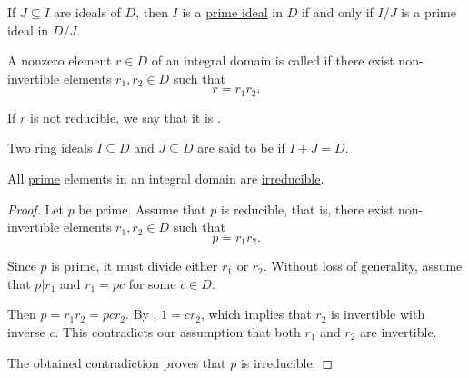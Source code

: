 \begin{proposition}\label{thm:prime_ideal_iff_prime_quotient_ideal}
  If \( J \subseteq I \) are ideals of \( D \), then \( I \) is a \hyperref[def:prime_ring_ideal]{prime ideal} in \( D \) if and only if \( I / J \) is a prime ideal in  \( D / J \).
\end{proposition}

\begin{definition}\label{def:irreducible_ring_element}
  A nonzero element \( r \in D \) of an integral domain is called  if there exist non-invertible elements \( r_1, r_2 \in D \) such that
  \begin{equation*}
    r = r_1 r_2.
  \end{equation*}

  If \( r \) is not reducible, we say that it is .
\end{definition}

\begin{definition}\label{def:coprime_ring_ideals}
  Two ring ideals \( I \subseteq D \) and \( J \subseteq D \) are said to be  if \( I + J = D \).
\end{definition}

\begin{proposition}\label{thm:prime_implies_irreducible}
  All \hyperref[def:prime_ring_ideal]{prime} elements in an integral domain are \hyperref[def:irreducible_ring_element]{irreducible}.
\end{proposition}
\begin{proof}
  Let \( p \) be prime. Assume that \( p \) is reducible, that is, there exist non-invertible elements \( r_1, r_2 \in D \) such that
  \begin{equation*}
    p = r_1 r_2.
  \end{equation*}

  Since \( p \) is prime, it must divide either \( r_1 \) or \( r_2 \). Without loss of generality, assume that \( p | r_1 \) and \( r_1 = pc \) for some \( c \in D \).

  Then \( p = r_1 r_2 = pc r_2 \). By , \( 1 = c r_2 \), which implies that \( r_2 \) is invertible with inverse \( c \). This contradicts our assumption that both \( r_1 \) and \( r_2 \) are invertible.

  The obtained contradiction proves that \( p \) is irreducible.
\end{proof}

